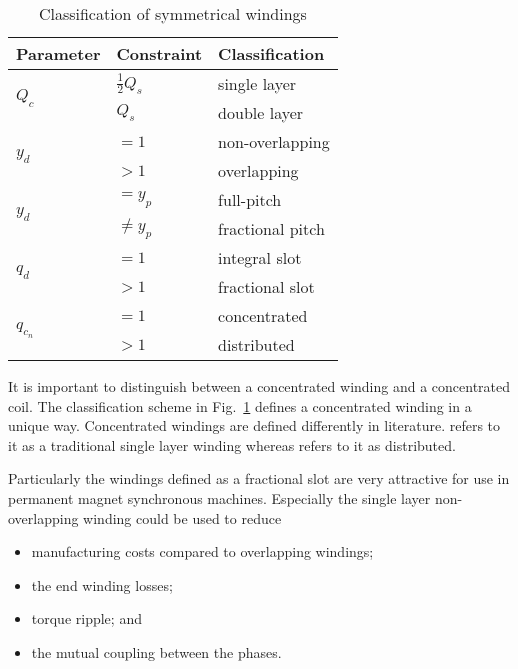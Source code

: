 {\renewcommand{\arraystretch}{1.2}
\begin{table}[htbp]
  \centering
  \caption{Classification of symmetrical windings}
  \label{fig:classification}
  \begin{tabular}{|l|l|l|}
  \hline
  Parameter  & Constraint  &  Classification  \\
  \hline
  \multirow{2}{*}{$Q_c$} & $\frac{1}{2}Q_s$ & single layer \\
                         & $Q_s$            & double layer \\
  \hline                        
  \multirow{2}{*}{$y_d$} & $=1$  & non-overlapping         \\
                         & $>1$  & overlapping             \\
  \hline                         
  \multirow{2}{*}{$y_d$} & $=y_p$     & full-pitch         \\
                         & $\neq y_p$ & fractional pitch   \\
  \hline                         
  \multirow{2}{*}{$q_d$} & $=1$     & integral slot        \\
                         & $>1$     & fractional slot      \\
  \hline                         
  \multirow{2}{*}{$q_{c_n}$} & $=1$     & concentrated     \\
                             & $>1$     & distributed      \\  
  \hline
  \end{tabular}
\end{table}}

It is important to distinguish between a concentrated winding and a concentrated coil. The classification scheme in Fig.~\ref{fig:classification} defines a concentrated winding in a unique way. Concentrated windings are defined differently in literature. \cite{REF-00814} refers to it as a traditional single layer winding whereas \cite{REF-00822} refers to it as distributed.

Particularly the windings defined as a fractional slot are very attractive for use in permanent magnet synchronous machines. Especially the single layer non-overlapping winding could be used to reduce
\begin{itemize}
  \item manufacturing costs compared to overlapping windings;
  \item the end winding losses;
  \item torque ripple; and
  \item the mutual coupling between the phases.
\end{itemize}

